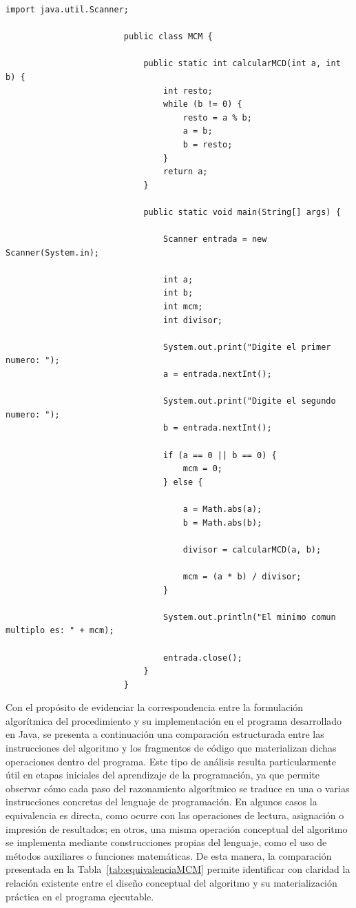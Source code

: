 \documentclass[12pt,twoside]{book}
\begin{document}
					\begin{lstlisting}[style=Java,caption={Cálculo del mínimo común múltiplo},label={lst:mcm}]
						import java.util.Scanner;
						
						public class MCM {
							
							public static int calcularMCD(int a, int b) {
								int resto;
								while (b != 0) {
									resto = a % b;
									a = b;
									b = resto;
								}
								return a;
							}
							
							public static void main(String[] args) {
								
								Scanner entrada = new Scanner(System.in);
								
								int a;
								int b;
								int mcm;
								int divisor;
								
								System.out.print("Digite el primer numero: ");
								a = entrada.nextInt();
								
								System.out.print("Digite el segundo numero: ");
								b = entrada.nextInt();
								
								if (a == 0 || b == 0) {
									mcm = 0;
								} else {
									
									a = Math.abs(a);
									b = Math.abs(b);
									
									divisor = calcularMCD(a, b);
									
									mcm = (a * b) / divisor;
								}
								
								System.out.println("El minimo comun multiplo es: " + mcm);
								
								entrada.close();
							}
						}
					\end{lstlisting}
					
					\noindent
					Con el propósito de evidenciar la correspondencia entre la formulación algorítmica del procedimiento y su implementación en el programa desarrollado en Java, se presenta a continuación una comparación estructurada entre las instrucciones del algoritmo y los fragmentos de código que materializan dichas operaciones dentro del programa. Este tipo de análisis resulta particularmente útil en etapas iniciales del aprendizaje de la programación, ya que permite observar cómo cada paso del razonamiento algorítmico se traduce en una o varias instrucciones concretas del lenguaje de programación. En algunos casos la equivalencia es directa, como ocurre con las operaciones de lectura, asignación o impresión de resultados; en otros, una misma operación conceptual del algoritmo se implementa mediante construcciones propias del lenguaje, como el uso de métodos auxiliares o funciones matemáticas. De esta manera, la comparación presentada en la Tabla~\ref{tab:equivalenciaMCM} permite identificar con claridad la relación existente entre el diseño conceptual del algoritmo y su materialización práctica en el programa ejecutable.
					
\end{document}
